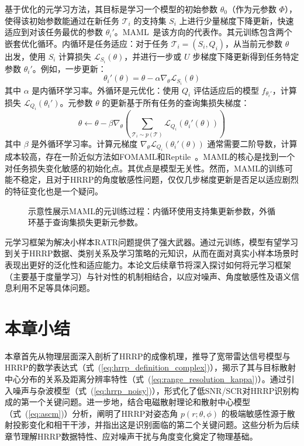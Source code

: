 基于优化的元学习方法，其目标是学习一个模型的初始参数 $\theta_0$（作为元参数 $\Phi$），使得该初始参数能通过在新任务 $\mathcal{T}_i$ 的支持集 $S_i$ 上进行少量梯度下降更新，快速适应到对该任务最优的参数 $\theta_i'$。MAML~\cite{X}是该方向的代表作。其元训练包含两个嵌套优化循环。内循环是任务适应：对于任务 $\mathcal{T}_i=(S_i, Q_i)$，从当前元参数 $\theta$ 出发，使用 $S_i$ 计算损失 $\mathcal{L}_{S_i}(\theta)$，并进行一步或 $U$ 步梯度下降更新得到任务特定参数 $\theta_i'$。例如，一步更新：
\begin{equation}
    \theta_i'(\theta) = \theta - \alpha \nabla_\theta \mathcal{L}_{S_i}(\theta)
    \label{eq:maml_inner_update}
\end{equation}
其中 $\alpha$ 是内循环学习率。外循环是元优化：使用 $Q_i$ 评估适应后的模型 $f_{\theta_i'}$，计算损失 $\mathcal{L}_{Q_i}(\theta_i')$。元参数 $\theta$ 的更新基于所有任务的查询集损失梯度：
\begin{equation}
    \theta \leftarrow \theta - \beta \nabla_\theta \left( \sum_{\mathcal{T}_i \sim p(\mathcal{T})} \mathcal{L}_{Q_i}(\theta_i'(\theta)) \right)
    \label{eq:maml_outer_update}
\end{equation}
其中 $\beta$ 是外循环学习率。计算元梯度 $\nabla_\theta \mathcal{L}_{Q_i}(\theta_i'(\theta))$ 通常需要二阶导数，计算成本较高，存在一阶近似方法如FOMAML和Reptile~\cite{X}。MAML的核心是找到一个对任务损失变化敏感的初始化点。其优点是模型无关性。然而，MAML的训练可能不稳定，且对于HRRP的角度敏感性问题，仅仅几步梯度更新是否足以适应剧烈的特征变化也是一个疑问。

\begin{figure}[h!]
    \centering
    \caption{示意性展示MAML的元训练过程：内循环使用支持集更新参数，外循环基于查询集损失更新元参数。}
    \label{fig:maml}
\end{figure}

元学习框架为解决小样本RATR问题提供了强大武器。通过元训练，模型有望学习到关于HRRP数据、类别关系及学习策略的元知识，从而在面对真实小样本场景时表现出更好的泛化性和适应能力。本论文后续章节将深入探讨如何将元学习框架（主要基于度量学习）与针对性的机制相结合，以应对噪声、角度敏感性及语义信息利用不足等具体问题。

\section{本章小结}
\label{sec:theory_summary}
本章首先从物理层面深入剖析了HRRP的成像机理，推导了宽带雷达信号模型与HRRP的数学表达式（式~(\ref{eq:hrrp_definition_complex})），揭示了其与目标散射中心分布的关系及距离分辨率特性（式~(\ref{eq:range_resolution_kappa})）。通过引入噪声与杂波模型（式~(\ref{eq:hrrp_noisy})），形式化了低SNR/SCR对HRRP识别构成的第一个关键问题。进一步地，结合电磁散射理论和散射中心模型（式~(\ref{eq:ascm})）分析，阐明了HRRP对姿态角 $p(r; \theta, \phi)$ 的极端敏感性源于散射投影变化和相干干涉，并指出这是识别面临的第二个关键问题。这些分析为后续章节理解HRRP数据特性、应对噪声干扰与角度变化奠定了物理基础。

